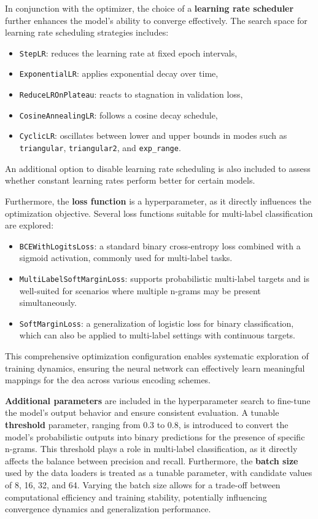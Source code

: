 In conjunction with the optimizer, the choice of a \textbf{learning rate scheduler} further enhances the model's ability to converge effectively.
The search space for learning rate scheduling strategies includes:
\begin{itemize}
    \item \texttt{StepLR}: reduces the learning rate at fixed epoch intervals,
    \item \texttt{ExponentialLR}: applies exponential decay over time,
    \item \texttt{ReduceLROnPlateau}: reacts to stagnation in validation loss,
    \item \texttt{CosineAnnealingLR}: follows a cosine decay schedule,
    \item \texttt{CyclicLR}: oscillates between lower and upper bounds in modes such as \texttt{triangular}, \texttt{triangular2}, and \texttt{exp\_range}.
\end{itemize}
An additional option to disable learning rate scheduling is also included to assess whether constant learning rates perform better for certain models.

Furthermore, the \textbf{loss function} is a hyperparameter, as it directly influences the optimization objective.
Several loss functions suitable for multi-label classification are explored:
\begin{itemize}
    \item \texttt{BCEWithLogitsLoss}: a standard binary cross-entropy loss combined with a sigmoid activation, commonly used for multi-label tasks.
    \item \texttt{MultiLabelSoftMarginLoss}: supports probabilistic multi-label targets and is well-suited for scenarios where multiple n-grams may be present simultaneously.
    \item \texttt{SoftMarginLoss}: a generalization of logistic loss for binary classification, which can also be applied to multi-label settings with continuous targets.
\end{itemize}

This comprehensive optimization configuration enables systematic exploration of training dynamics, ensuring the neural network can effectively learn meaningful mappings for the \ac{dea} across various encoding schemes.

\textbf{Additional parameters} are included in the hyperparameter search to fine-tune the model's output behavior and ensure consistent evaluation.
A tunable \textbf{threshold} parameter, ranging from 0.3 to 0.8, is introduced to convert the model’s probabilistic outputs into binary predictions for the presence of specific n-grams.
This threshold plays a  role in multi-label classification, as it directly affects the balance between precision and recall.
Furthermore, the \textbf{batch size} used by the data loaders is treated as a tunable parameter, with candidate values of 8, 16, 32, and 64. Varying the batch size allows for a trade-off between computational efficiency and training stability, potentially influencing convergence dynamics and generalization performance.



